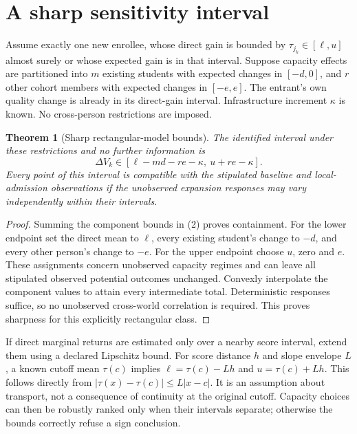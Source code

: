 \documentclass[11pt,a4paper]{article}
\newtheorem{theorem}{Theorem}[section]
\begin{document}
\section{A sharp sensitivity interval}
Assume exactly one new enrollee, whose direct gain is bounded by $\tau_{j_k}\in[\ell,u]$ almost surely or whose expected gain is in that interval. Suppose capacity effects are partitioned into $m$ existing students with expected changes in $[-d,0]$, and $r$ other cohort members with expected changes in $[-e,e]$. The entrant's own quality change is already in its direct-gain interval. Infrastructure increment $\kappa$ is known. No cross-person restrictions are imposed.

\begin{theorem}[Sharp rectangular-model bounds]
The identified interval under these restrictions and no further information is
\[
 \Delta V_k\in[\ell-md-re-\kappa,\ u+re-\kappa].            \tag{4}
\]
Every point of this interval is compatible with the stipulated baseline and local-admission observations if the unobserved expansion responses may vary independently within their intervals.
\end{theorem}
\begin{proof}
Summing the component bounds in (2) proves containment. For the lower endpoint set the direct mean to $\ell$, every existing student's change to $-d$, and every other person's change to $-e$. For the upper endpoint choose $u$, zero and $e$. These assignments concern unobserved capacity regimes and can leave all stipulated observed potential outcomes unchanged. Convexly interpolate the component values to attain every intermediate total. Deterministic responses suffice, so no unobserved cross-world correlation is required. This proves sharpness for this explicitly rectangular class.
\end{proof}

If direct marginal returns are estimated only over a nearby score interval, extend them using a declared Lipschitz bound. For score distance $h$ and slope envelope $L$, a known cutoff mean $\tau(c)$ implies $\ell=\tau(c)-Lh$ and $u=\tau(c)+Lh$. This follows directly from $|\tau(x)-\tau(c)|\le L|x-c|$. It is an assumption about transport, not a consequence of continuity at the original cutoff. Capacity choices can then be robustly ranked only when their intervals separate; otherwise the bounds correctly refuse a sign conclusion.
\end{document}
